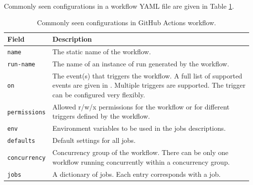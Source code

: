 Commonly seen configurations in a workflow YAML file are given in Table \ref{tab:githubactions_workflow}.
\begin{table}[!htb]
	\centering \caption{Commonly seen configurations in GitHub Actions workflow.}\label{tab:githubactions_workflow}
	\begin{tabularx}{\textwidth}{lX}
		\hline
		Field & Description \\ \hline
		\texttt{name} & The static name of the workflow.  \\ 
		\texttt{run-name} & The name of an instance of run generated by the workflow.  \\ 
		\texttt{on} & The event(s) that triggers the workflow. A full list of supported events are given in \cite{git2025reference}. Multiple triggers are supported. The trigger can be configured very flexibly. \\ 
		\texttt{permissions} & Allowed r/w/x permissions for the workflow or for different triggers defined by the workflow. \\ 
		\texttt{env} & Environment variables to be used in the jobs descriptions. \\
		\texttt{defaults} & Default settings for all jobs. \\
		\texttt{concurrency} & Concurrency group of the workflow. There can be only one workflow running concurrently within a concurrency group. \\
		\texttt{jobs} & A dictionary of jobs. Each entry corresponds with a job. \\
		\hline
	\end{tabularx}
\end{table}

